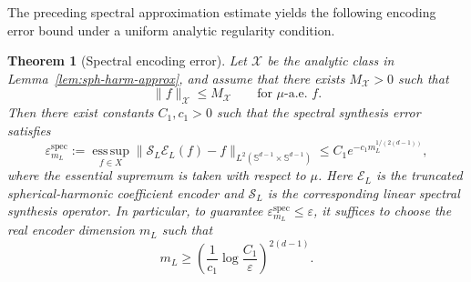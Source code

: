 \documentclass{article}
\numberwithin{equation}{section}
\theoremstyle{plain}
\newtheorem{theorem}{Theorem}[section]
\begin{document}
	The preceding spectral approximation estimate yields the following encoding error bound under a uniform analytic regularity condition.
	\begin{theorem}[Spectral encoding error]
		\label{prop:encoder-error}
		Let $\mathcal X$ be the analytic class in
		Lemma~\ref{lem:sph-harm-approx}, and assume that there exists
		$M_{\mathcal X}>0$ such that
		\begin{equation*}
			\|f\|_{\mathcal X}\le M_{\mathcal X}
			\qquad \text{for }\mu\text{-a.e. } f.
		\end{equation*}
		Then there exist constants $C_1,c_1>0$ such that the spectral synthesis error satisfies
		\begin{equation*}
		\varepsilon_{m_L}^{\mathrm{spec}}
		:=
		\operatorname*{ess\,sup}_{f\in X}
		\|\mathcal S_L\mathcal E_L(f)-f\|_{L^2(\mathbb S^{d-1}\times\mathbb S^{d-1})}
		\le C_1 e^{-c_1 m_L^{1/(2(d-1))}} ,
		\end{equation*}
		where the essential supremum is taken with respect to $\mu$. Here $\mathcal E_L$ is the truncated spherical-harmonic coefficient encoder and $\mathcal S_L$ is the corresponding linear spectral synthesis operator. In particular, to guarantee $\varepsilon_{m_L}^{\mathrm{spec}}\le \varepsilon$, it suffices to choose the real encoder dimension $m_L$ such that
		\begin{equation*}
		m_L \ge \left(\frac{1}{c_1}\log\frac{C_1}{\varepsilon}\right)^{2(d-1)}.
		\end{equation*}
	\end{theorem}
\end{document}
